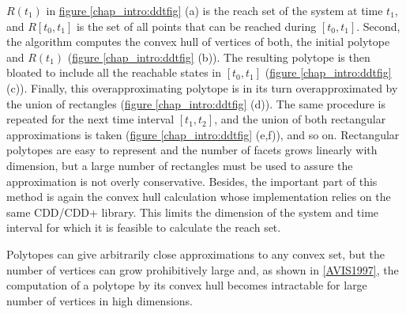 \documentclass[letterpaper,10pt,english]{sphinxmanual}
\begin{document}
$R(t_1)$ in \hyperref[chap_intro:ddtfig]{figure  \ref*{chap_intro:ddtfig}} (a) is the reach set of the system at
time $t_1$, and $R[t_0, t_1]$ is the set of all points that
can be reached during $[t_0, t_1]$. Second, the algorithm computes
the convex hull of vertices of both, the initial polytope and
$R(t_1)$ (\hyperref[chap_intro:ddtfig]{figure  \ref*{chap_intro:ddtfig}} (b)). The resulting polytope is then
bloated to include all the reachable states in $[t_0,t_1]$ (\hyperref[chap_intro:ddtfig]{figure  \ref*{chap_intro:ddtfig}} (c)).
Finally, this overapproximating polytope is in its turn
overapproximated by the union of rectangles (\hyperref[chap_intro:ddtfig]{figure  \ref*{chap_intro:ddtfig}} (d)). The
same procedure is repeated for the next time interval $[t_1,t_2]$,
and the union of both rectangular approximations is taken (\hyperref[chap_intro:ddtfig]{figure  \ref*{chap_intro:ddtfig}} (e,f)),
and so on. Rectangular polytopes are easy to represent
and the number of facets grows linearly with dimension, but a large
number of rectangles must be used to assure the approximation is not
overly conservative. Besides, the important part of this method is again
the convex hull calculation whose implementation relies on the same
CDD/CDD+ library. This limits the dimension of the system and time
interval for which it is feasible to calculate the reach set.

Polytopes can give arbitrarily close approximations to any convex set,
but the number of vertices can grow prohibitively large and, as shown in
{\hyperref[chap_intro:avis1997]{{[}AVIS1997{]}}}, the computation of a polytope by its
convex hull becomes intractable for large number of vertices in high
dimensions.
\end{document}
